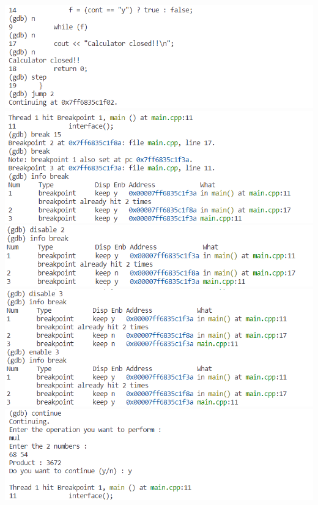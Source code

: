 \documentclass{article}
\begin{document}
\includegraphics[scale=0.70]{cpp_debug_05}\\
\includegraphics[scale=0.70]{cpp_debug_06}\\
\includegraphics[scale=0.70]{cpp_debug_07}\\
\includegraphics[scale=0.70]{cpp_debug_08}\\
\includegraphics[scale=0.70]{cpp_debug_09}\\
\end{document}
